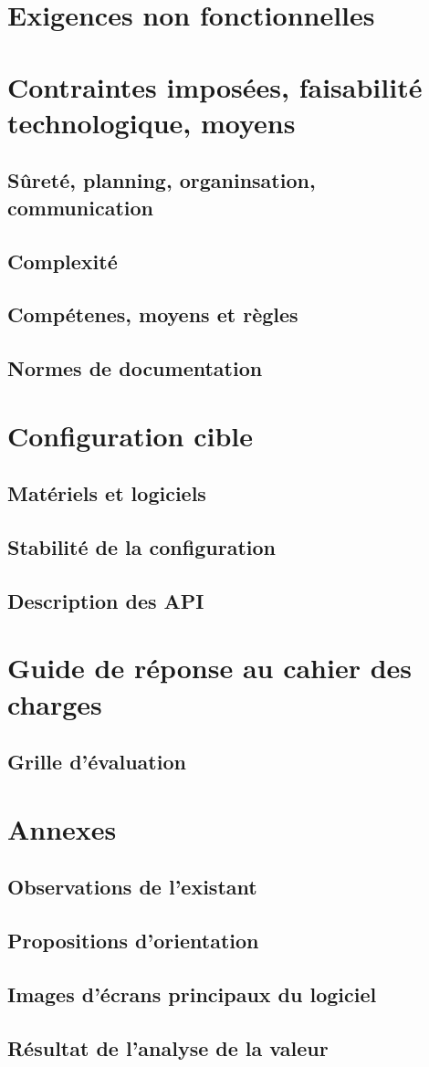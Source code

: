 \section{Exigences non fonctionnelles}

\section{Contraintes imposées, faisabilité technologique, moyens}
\subsection{Sûreté, planning, organinsation, communication}
\subsection{Complexité}
\subsection{Compétenes, moyens et règles}
\subsection{Normes de documentation}

\section{Configuration cible}
\subsection{Matériels et logiciels}
\subsection{Stabilité de la configuration}
\subsection{Description des API}

\section{Guide de réponse au cahier des charges}
\subsection{Grille d'évaluation}

\section{Annexes}
\subsection{Observations de l'existant}
\subsection{Propositions d'orientation}
\subsection{Images d'écrans principaux du logiciel}
\subsection{Résultat de l'analyse de la valeur}
